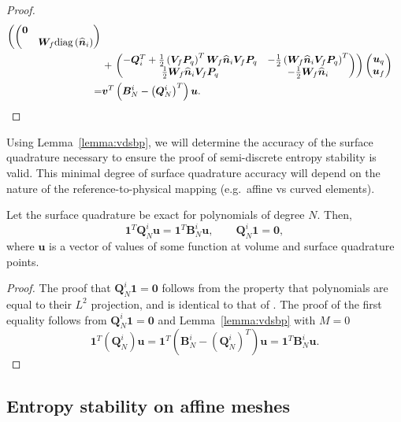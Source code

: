 \documentclass[review]{siamart0216}
\theoremstyle{assumption}
\renewcommand{\hat}[1]{\hat{#1}}
\newcommand{\LRp}[1]{\left( #1 \right)}
\renewcommand{\hat}{\widehat}
\newcommand{\diag}[1]{{\rm diag}\LRp{#1}}
\begin{document}
\begin{proof}
\begin{align*}
\left(\begin{pmatrix}
\bm{0}& \\
& \bm{W}_f\diag{\hat{\bm{n}}_i}
\end{pmatrix}\right.\\
&+
\left.\begin{pmatrix}
-\bm{Q}_i^T + \frac{1}{2}\LRp{\bm{V}_f\bm{P}_q}^T\bm{W}_f\hat{\bm{n}}_i \bm{V}_f\bm{P}_q & -\frac{1}{2} \LRp{\bm{W}_f\hat{\bm{n}}_i \bm{V}_f\bm{P}_q}^T\\
\frac{1}{2}\bm{W}_f\hat{\bm{n}}_i \bm{V}_f\bm{P}_q & -\frac{1}{2}\bm{W}_f\hat{\bm{n}}_i
\end{pmatrix}  \right)
\begin{pmatrix} \bm{u}_q\\ \bm{u}_f\end{pmatrix}\\
=& \bm{v}^T\LRp{\bm{B}^i_N - \LRp{\bm{Q}^i_N}^T}\bm{u}.
\end{align*}
\end{proof}
Using Lemma~\ref{lemma:vdsbp}, we will determine the accuracy of the surface quadrature necessary to ensure the proof of semi-discrete entropy stability is valid.  This minimal degree of surface quadrature accuracy will depend on the nature of the reference-to-physical mapping (e.g.\ affine vs curved elements).

\begin{corollary}
\label{lemma:sbpcor}
Let the surface quadrature be exact for polynomials of degree $N$.  Then, 
\[
\bm{1}^T\bm{Q}^i_N\bm{u} = \bm{1}^T\bm{B}^i_N\bm{u}, \qquad \bm{Q}^i_N\bm{1} = \bm{0},
\]
where $\bm{u}$ is a vector of values of some function at volume and surface quadrature points. %
\end{corollary}
\begin{proof}
The proof that $\bm{Q}^i_N \bm{1} = \bm{0}$ follows from the property that polynomials are equal to their $L^2$ projection, and is identical to that of \cite{chan2017discretely,chan2018discretely}.     The proof of the first equality follows from $\bm{Q}^i_N \bm{1} = \bm{0}$ and Lemma~\ref{lemma:vdsbp} with $M=0$
\[
\bm{1}^T\LRp{\bm{Q}^i_N}\bm{u} = \bm{1}^T\LRp{\bm{B}^i_N - \LRp{\bm{Q}^i_N}^T}\bm{u} = \bm{1}^T{\bm{B}^i_N}\bm{u}.
\]
\end{proof}

\subsection{Entropy stability on affine meshes}
\end{document}
